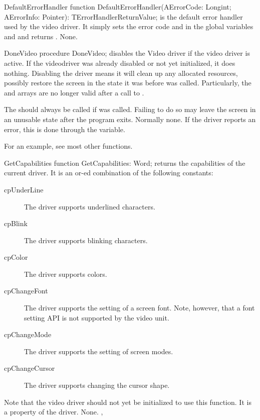 
\begin{procedure}{DefaultErrorHandler}
\Declaration
function  DefaultErrorHandler(AErrorCode: Longint; AErrorInfo: Pointer): TErrorHandlerReturnValue; 
\Description
{} is the default error handler used by the video
driver. It simply sets the error code  and  
in the global variables  and  and returns 
.
\Errors
None.
\SeeAlso
\end{procedure}

\begin{procedure}{DoneVideo}
\Declaration
procedure DoneVideo; 
\Description
{} disables the Video driver if the video driver is active. If
the videodriver was already disabled or not yet initialized, it does
nothing. Disabling the driver means it will clean up any allocated
resources, possibly restore the screen in the state it was before
 was called. Particularly, the  and
 arrays are no longer valid after a call to 
.

The  should always be called if  was called.
Failing to do so may leave the screen in an unusable state after the program
exits.
\Errors
Normally none. If the driver reports an error, this is done through the
 variable.
\SeeAlso
{}
\end{procedure}

For an example, see most other functions.

\begin{function}{GetCapabilities}
\Declaration
function GetCapabilities: Word; 
\Description
{} returns the capabilities of the current driver.
It is an or-ed combination of the following constants:
\begin{description}
\item[cpUnderLine] The driver supports underlined characters.
\item[cpBlink] The driver supports blinking characters.
\item[cpColor] The driver supports colors.
\item[cpChangeFont] The driver supports the setting of a screen font.
Note, however, that a font setting API is not supported by the video unit.
\item[cpChangeMode] The driver supports the setting of screen modes. 
\item[cpChangeCursor] The driver supports changing the cursor shape.
\end{description}
Note that the video driver should not yet be initialized to use this
function. It is a property of the driver.
\Errors
None.
\SeeAlso
{}, 
\end{function}

